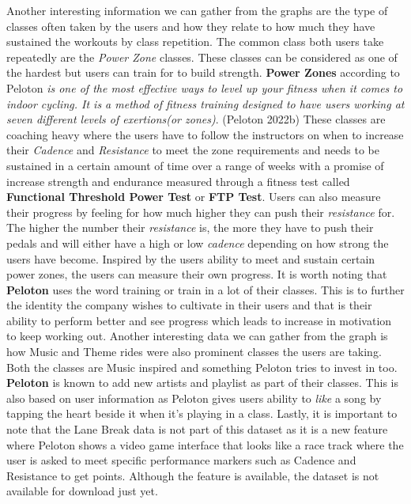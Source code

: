 \documentclass[
]{article}
\begin{document}
Another interesting information we can gather from the graphs are the type of classes often taken by the users and how they relate to how much they have sustained the workouts by class repetition. The common class both users take repeatedly are the \emph{Power Zone} classes. These classes can be considered as one of the hardest but users can train for to build strength. \textbf{Power Zones} according to Peloton \emph{is one of the most effective ways to level up your fitness when it comes to indoor cycling. It is a method of fitness training designed to have users working at seven different levels of exertions(or zones)}. (Peloton 2022b) These classes are coaching heavy where the users have to follow the instructors on when to increase their \emph{Cadence} and \emph{Resistance} to meet the zone requirements and needs to be sustained in a certain amount of time over a range of weeks with a promise of increase strength and endurance measured through a fitness test called \textbf{Functional Threshold Power Test} or \textbf{FTP Test}. Users can also measure their progress by feeling for how much higher they can push their \emph{resistance} for. The higher the number their \emph{resistance} is, the more they have to push their pedals and will either have a high or low \emph{cadence} depending on how strong the users have become. Inspired by the users ability to meet and sustain certain power zones, the users can measure their own progress. It is worth noting that \textbf{Peloton} uses the word training or train in a lot of their classes. This is to further the identity the company wishes to cultivate in their users and that is their ability to perform better and see progress which leads to increase in motivation to keep working out. Another interesting data we can gather from the graph is how Music and Theme rides were also prominent classes the users are taking. Both the classes are Music inspired and something Peloton tries to invest in too. \textbf{Peloton} is known to add new artists and playlist as part of their classes. This is also based on user information as Peloton gives users ability to \emph{like} a song by tapping the heart beside it when it's playing in a class. Lastly, it is important to note that the Lane Break data is not part of this dataset as it is a new feature where Peloton shows a video game interface that looks like a race track where the user is asked to meet specific performance markers such as Cadence and Resistance to get points. Although the feature is available, the dataset is not available for download just yet.
\end{document}
